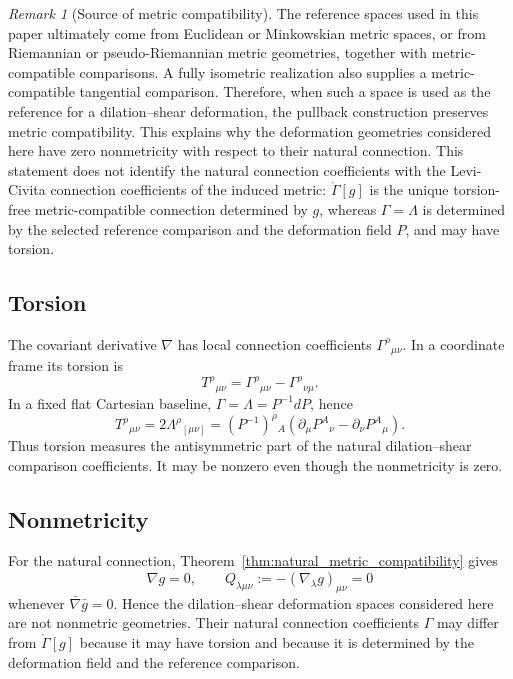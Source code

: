 \documentclass[12pt]{amsart}
\theoremstyle{definition}
\theoremstyle{remark}
\newtheorem{remark}[theorem]{Remark}
\begin{document}
\begin{remark}[Source of metric compatibility]
The reference spaces used in this paper ultimately come from Euclidean or Minkowskian metric spaces, or from Riemannian or pseudo-Riemannian metric geometries, together with metric-compatible comparisons.  A fully isometric realization also supplies a metric-compatible tangential comparison.  Therefore, when such a space is used as the reference for a dilation--shear deformation, the pullback construction preserves metric compatibility.  This explains why the deformation geometries considered here have zero nonmetricity with respect to their natural connection.  This statement does not identify the natural connection coefficients with the Levi-Civita connection coefficients of the induced metric: \(\mathring\Gamma[g]\) is the unique torsion-free metric-compatible connection determined by \(g\), whereas \(\Gamma=\Lambda\) is determined by the selected reference comparison and the deformation field \(P\), and may have torsion.
\end{remark}

\subsection{Torsion}\label{subsec:torsion}

The covariant derivative \(\nabla\) has local connection coefficients \(\Gamma^\rho{}_{\mu\nu}\).  In a coordinate frame its torsion is
\begin{equation}\label{eq:general_torsion_selected_connection}
 T^\rho{}_{\mu\nu}=\Gamma^\rho{}_{\mu\nu}-\Gamma^\rho{}_{\nu\mu}.
\end{equation}
In a fixed flat Cartesian baseline, \(\Gamma=\Lambda=P^{-1}dP\), hence
\begin{equation}\label{eq:torsion_Lambda_general}
 T^\rho{}_{\mu\nu}=2\Lambda^\rho{}_{[\mu\nu]}
 =(P^{-1})^\rho{}_A\left(\partial_\mu P^A{}_{\nu}-\partial_\nu P^A{}_{\mu}\right).
\end{equation}
Thus torsion measures the antisymmetric part of the natural dilation--shear comparison coefficients.  It may be nonzero even though the nonmetricity is zero.

\subsection{Nonmetricity}\label{subsec:nonmetricity}

For the natural connection, Theorem~\ref{thm:natural_metric_compatibility} gives
\begin{equation}\label{eq:natural_metric_compatible}
 \nabla g=0,
 \qquad
 Q_{\lambda\mu\nu}:=-(\nabla_\lambda g)_{\mu\nu}=0
\end{equation}
whenever \(\bar\nabla\bar g=0\).  Hence the dilation--shear deformation spaces considered here are not nonmetric geometries.  Their natural connection coefficients \(\Gamma\) may differ from \(\mathring\Gamma[g]\) because it may have torsion and because it is determined by the deformation field and the reference comparison.
\end{document}
